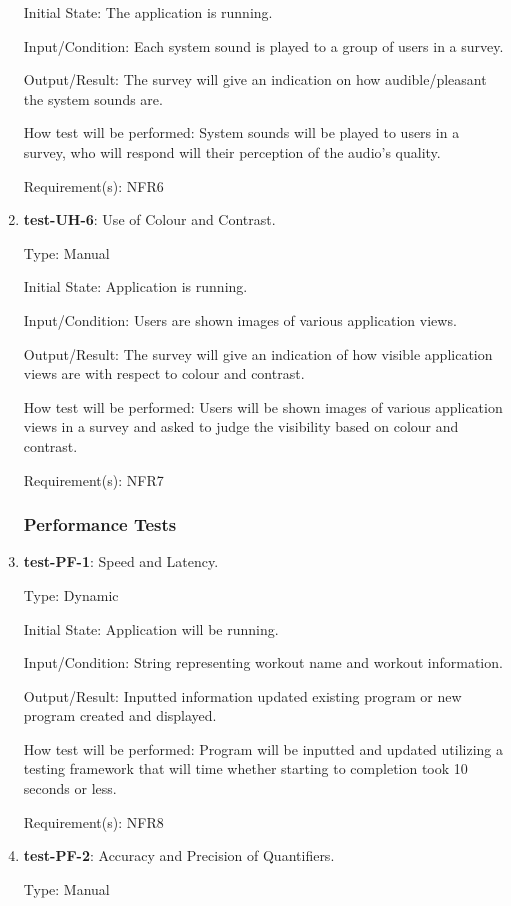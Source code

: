 \documentclass[12pt, titlepage]{article}
\begin{document}
\begin{enumerate}
		Initial State: The application is running.
		
		Input/Condition: Each system sound is played to a group of users in a survey.
		
		Output/Result: The survey will give an indication on how audible/pleasant the system sounds are.
		
		How test will be performed: System sounds will be played to users in a survey, who will respond will their perception of the audio's quality.
		
		Requirement(s): NFR6
		
		\item{\textbf{test-UH-6}}: Use of Colour and Contrast.
		
		Type: Manual
		
		Initial State: Application is running.
		
		Input/Condition: Users are shown images of various application views.
		
		Output/Result: The survey will give an indication of how visible application views are with respect to colour and contrast.
		
		How test will be performed: Users will be shown images of various application views in a survey and asked to judge the visibility based on colour and contrast.
		
		Requirement(s): NFR7
	\subsubsection{Performance Tests}
		\item{\textbf{test-PF-1}}: Speed and Latency.
		
		Type: Dynamic
		
		Initial State: Application will be running.
		
		Input/Condition: String representing workout name and workout information.
		
		Output/Result: Inputted information updated existing program or new program created and displayed.
		
		How test will be performed: Program will be inputted and updated utilizing a testing framework that will time whether starting to completion took 10 seconds or less. 
		
		Requirement(s): NFR8
		
		\item{\textbf{test-PF-2}}: Accuracy and Precision of Quantifiers.
		
		Type: Manual
		

\end{enumerate}
\end{document}
